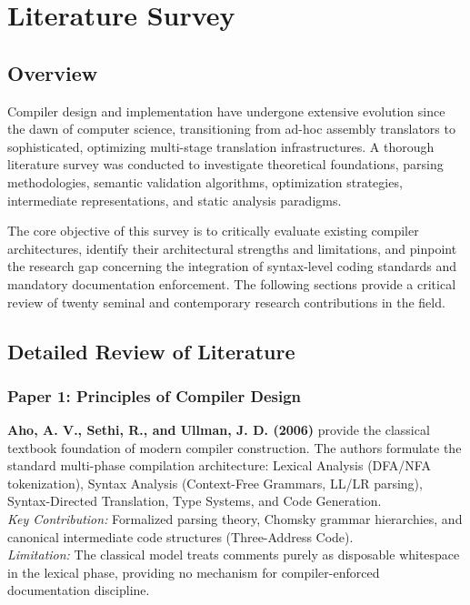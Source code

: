 \chapter{Literature Survey}\doublespacing

\section{Overview}
Compiler design and implementation have undergone extensive evolution since the dawn of computer science, transitioning from ad-hoc assembly translators to sophisticated, optimizing multi-stage translation infrastructures. A thorough literature survey was conducted to investigate theoretical foundations, parsing methodologies, semantic validation algorithms, optimization strategies, intermediate representations, and static analysis paradigms.

The core objective of this survey is to critically evaluate existing compiler architectures, identify their architectural strengths and limitations, and pinpoint the research gap concerning the integration of syntax-level coding standards and mandatory documentation enforcement. The following sections provide a critical review of twenty seminal and contemporary research contributions in the field.

\section{Detailed Review of Literature}

\subsection{Paper 1: Principles of Compiler Design}
\textbf{Aho, A. V., Sethi, R., and Ullman, J. D. (2006)} \cite{aho2006compilers} provide the classical textbook foundation of modern compiler construction. The authors formulate the standard multi-phase compilation architecture: Lexical Analysis (DFA/NFA tokenization), Syntax Analysis (Context-Free Grammars, LL/LR parsing), Syntax-Directed Translation, Type Systems, and Code Generation. \\
\textit{Key Contribution:} Formalized parsing theory, Chomsky grammar hierarchies, and canonical intermediate code structures (Three-Address Code). \\
\textit{Limitation:} The classical model treats comments purely as disposable whitespace in the lexical phase, providing no mechanism for compiler-enforced documentation discipline.

